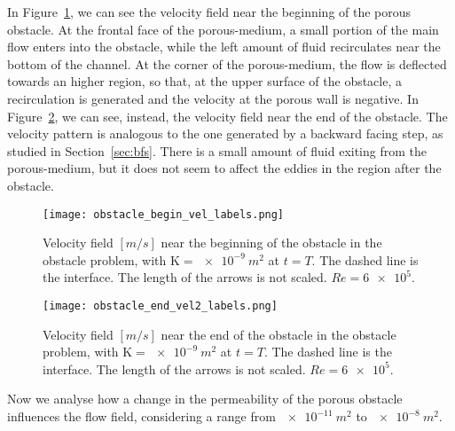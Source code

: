 In Figure~\ref{fig:obstacle_begin}, we can see the velocity field near the beginning of the porous obstacle. At the frontal face of the porous-medium, a small portion of the main flow enters into the obstacle, while the left amount of fluid recirculates near the bottom of the channel. At the corner of the porous-medium, the flow is deflected towards an higher region, so that, at the upper surface of the obstacle, a recirculation is generated and the velocity at the porous wall is negative.
In Figure~\ref{fig:obstacle_end}, we can see, instead, the velocity field near the end of the obstacle. The velocity pattern is analogous to the one generated by a backward facing step, as studied in Section~\ref{sec:bfs}. There is a small amount of fluid exiting from the porous-medium, but it does not seem to affect the eddies in the region after the obstacle.
\begin{figure}
	\centering
	\texttt{[image: obstacle\_begin\_vel\_labels.png]}
	\caption[Velocity field near the beginning of the obstacle in the obstacle problem]{Velocity field $[\si{m/s}]$ near the beginning of the obstacle in the obstacle problem, with $\mathrm{K} = \SI{e-9}{m^2}$ at $t=T$.
	The dashed line is the interface.
	The length of the arrows is not scaled. $Re = \num{6e5}$.}
	\label{fig:obstacle_begin}
\end{figure}
\begin{figure}
	\centering
	\texttt{[image: obstacle\_end\_vel2\_labels.png]}
	\caption[Velocity field near the end of the obstacle in the obstacle problem]{Velocity field $[\si{m/s}]$ near the end of the obstacle in the obstacle problem, with $\mathrm{K} = \SI{e-9}{m^2}$ at $t=T$.
	The dashed line is the interface.
	The length of the arrows is not scaled. $Re = \num{6e5}$.}
	\label{fig:obstacle_end}
\end{figure}

Now we analyse how a change in the permeability of the porous obstacle influences the flow field, considering a range from $\SI{e-11}{m^2}$ to $\SI{e-8}{m^2}$.

